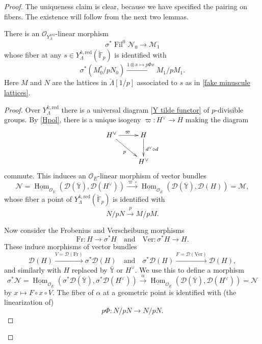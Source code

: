 \documentclass[11pt]{alggeom}
\newcommand{\map}[1]{\xrightarrow{#1}}
\newcommand{\red}{\mathrm{red}}
\newcommand{\F}{\mathbb F}
\newcommand{\co}{\mathcal O}
\DeclareMathOperator{\Hom}{Hom}
\DeclareMathOperator{\Fil}{Fil}
\begin{document}
\begin{proof}
The uniqueness claim is clear, because we have specified the pairing on fibers.  The existence will follow from the next two lemmas.






\begin{lemma}\label{lem:goof map}
There is an $\co_{Y^\red_\Lambda}$-linear morphism
\[
\sigma^* \Fil^0 \mathscr{N}_0 \to \mathscr{M}_1
\]
whose fiber at any $s\in Y^{k,\red}_\Lambda(\breve{\F}_p)$ is identified with 
\[
 \sigma^* (   M_0^* /  p N_0  )  \map{ 1 \otimes x \mapsto p \Phi x }  M_1 / pM_1  .
\]
Here $M$ and $N$ are the lattices in $\breve{\Lambda}[1/p]$ associated to  $s$ as in \eqref{fake minuscule lattices}.
\end{lemma}

\begin{proof}
Over $Y^{k,\red}_\Lambda$ there is a universal diagram \eqref{Y tilde functor} of $p$-divisible groups.
By \eqref{Hpol}, there is a unique isogeny  $\varpi : H^\vee \to H$  making the diagram 
\[
\xymatrix{
{H^\vee}  \ar[dr]_p  \ar[r]^{\varpi}  & { H  }  \ar[d]^{ d^\vee \circ d}  \\
{    }   &  {   H^\vee  } 
}
\]
commute. This induces an $\co_E$-linear morphism of vector bundles
\[
  \mathscr{N}= \underline{\Hom}_{\co_E}  ( \mathscr{D}(\overline{\mathbb{Y}} ) , \mathscr{D}(H^\vee)  )
  \map{  \varpi  \circ }
   \underline{\Hom}_{\co_E}  ( \mathscr{D}(\overline{\mathbb{Y}} ) , \mathscr{D}(H)  )
   = \mathscr{M},
\]
whose fiber a point of $Y^{k,\red}_\Lambda(\breve{\F}_p)$ is identified with
\[
N / pN \map{p }  M/pM .
\]

Now consider the Frobenius   and Verscheibung morphisms
\[
\mathrm{Fr} :  H \to \sigma^*H
\quad \mbox{and}\quad \mathrm{Ver} : \sigma^* H\to H .
\]
These induce morphisms of vector bundles
\[
 \mathscr{D}( H) \map{ V=\mathscr{D}(  \mathrm{Fr})  }  \sigma^*  \mathscr{D}( H )
 \quad \mbox{and}\quad 
 \sigma^* \mathscr{D}( H ) \map{ F=\mathscr{D}(  \mathrm{Ver})  }   \mathscr{D}( H ),
\]
and similarly with $H$ replaced by $\overline{\mathbb{Y}}$ or $H^\vee$.  
We use this to define a morphism 
\[
\sigma^* \mathscr{N} = 
 \underline{\Hom}_{\co_E} ( \sigma^*\mathscr{D}(\overline{\mathbb{Y}} ) , \sigma^* \mathscr{D}(H^\vee)  ) 
 \map{\alpha}
  \underline{\Hom}_{\co_E}  ( \mathscr{D}(\overline{\mathbb{Y}} )  , \mathscr{D}(H^\vee) )
  = \mathscr{N}
\]
by $x \mapsto  F \circ x \circ V$.
The   fiber of $\alpha$ at a geometric point is identified with (the linearization of)
\[
p\Phi :  N  /pN  \to N / pN.
\]



\end{proof}
\end{proof}
\end{document}
